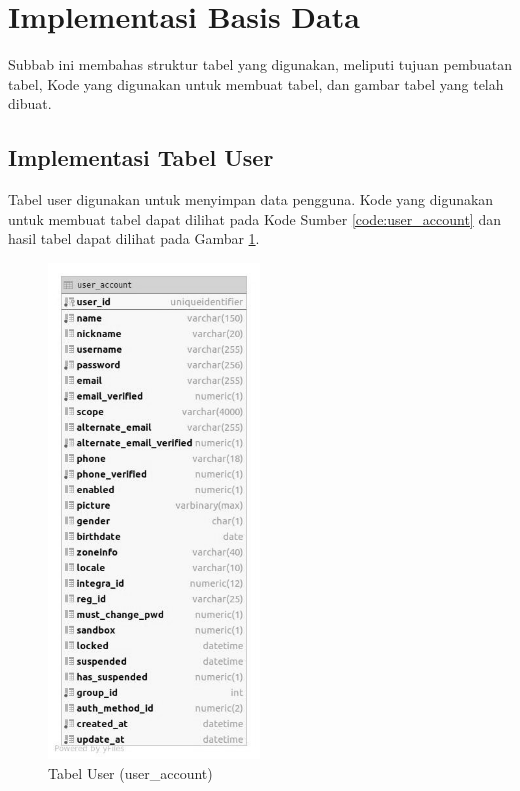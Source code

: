 \section{Implementasi Basis Data}
\par Subbab ini membahas struktur tabel yang digunakan, meliputi tujuan pembuatan tabel, Kode yang digunakan untuk membuat tabel, dan gambar tabel yang telah dibuat.

\subsection{Implementasi Tabel User}
\par Tabel user digunakan untuk menyimpan data pengguna. Kode yang digunakan untuk membuat tabel dapat dilihat pada Kode Sumber \ref{code:user_account} dan hasil tabel dapat dilihat pada Gambar \ref{tabel_user_account}.

\begin{figure}[H]
	\caption{Tabel User (user\_account)}
	\label{tabel_user_account}
    \centering\includegraphics[width=0.5\textwidth]{bab4/figures/tabel_user_account.jpg}
\end{figure}

